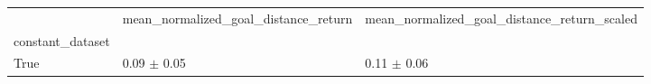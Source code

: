 \begin{tabular}{lll}
\toprule
 & mean_normalized_goal_distance_return & mean_normalized_goal_distance_return_scaled \\
constant_dataset &  &  \\
\midrule
True & 0.09 $\pm$ 0.05 & 0.11 $\pm$ 0.06 \\
\bottomrule
\end{tabular}
